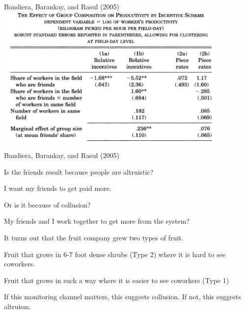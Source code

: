 \documentclass[aspectratio=169,usenames,dvipsnames]{beamer}
\newenvironment{wideitemize}{\itemize\addtolength{\itemsep}{10pt}}{\enditemize}
\begin{document}
\begin{frame}[c]{Bandiera, Barankay, and Rasul (2005)}
\centering
\includegraphics[width=0.85\textwidth]{pictures/friends_tournaments.png}

    
\end{frame}

\begin{frame}{Bandiera, Barankay, and Rasul (2005)}
    \begin{wideitemize}
        \item Is the friends result because people are altruistic?
        \begin{wideitemize}
            \item I want my friends to get paid more.
        \end{wideitemize}
        \item Or is it because of collusion?
        \begin{wideitemize}
            \item My friends and I work together to get more from the system?
        \end{wideitemize}
        \item It turns out that the fruit company grew two types of fruit.
        \begin{wideitemize}
            \item Fruit that grows in 6-7 foot dense shrubs (Type 2) where it is hard to see coworkers.
            \item Fruit that grows in such a way where it is easier to see coworkers (Type 1)
        \end{wideitemize}
        \item If this monitoring channel matters, this suggests collusion. If not, this suggests altruism.
    \end{wideitemize}
\end{frame}
\end{document}
